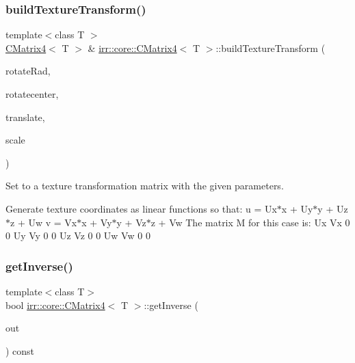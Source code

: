 \subsubsection{\texorpdfstring{build\+Texture\+Transform()}{buildTextureTransform()}}
{\footnotesize\ttfamily template$<$class T $>$ \\
\hyperlink{classirr_1_1core_1_1CMatrix4}{C\+Matrix4}$<$ T $>$ \& \hyperlink{classirr_1_1core_1_1CMatrix4}{irr\+::core\+::\+C\+Matrix4}$<$ T $>$\+::build\+Texture\+Transform (\begin{DoxyParamCaption}\item[{\hyperlink{namespaceirr_a0277be98d67dc26ff93b1a6a1d086b07}{f32}}]{rotate\+Rad,  }\item[{const \hyperlink{namespaceirr_1_1core_a116f90bd31515724b6235014ee2b74d5}{core\+::vector2df} \&}]{rotatecenter,  }\item[{const \hyperlink{namespaceirr_1_1core_a116f90bd31515724b6235014ee2b74d5}{core\+::vector2df} \&}]{translate,  }\item[{const \hyperlink{namespaceirr_1_1core_a116f90bd31515724b6235014ee2b74d5}{core\+::vector2df} \&}]{scale }\end{DoxyParamCaption})\hspace{0.3cm}{\ttfamily [inline]}}



Set to a texture transformation matrix with the given parameters. 

Generate texture coordinates as linear functions so that\+: u = Ux$\ast$x + Uy$\ast$y + Uz$\ast$z + Uw v = Vx$\ast$x + Vy$\ast$y + Vz$\ast$z + Vw The matrix M for this case is\+: Ux Vx 0 0 Uy Vy 0 0 Uz Vz 0 0 Uw Vw 0 0 \mbox{\label{classirr_1_1core_1_1CMatrix4_a323bfa0e327636c9cd4a5d2b781b3a60}} 
\subsubsection{\texorpdfstring{get\+Inverse()}{getInverse()}\hspace{0.1cm}{\footnotesize\ttfamily [1/2]}}
{\footnotesize\ttfamily template$<$class T$>$ \\
bool \hyperlink{classirr_1_1core_1_1CMatrix4}{irr\+::core\+::\+C\+Matrix4}$<$ T $>$\+::get\+Inverse (\begin{DoxyParamCaption}\item[{\hyperlink{classirr_1_1core_1_1CMatrix4}{C\+Matrix4}$<$ T $>$ \&}]{out }\end{DoxyParamCaption}) const}



